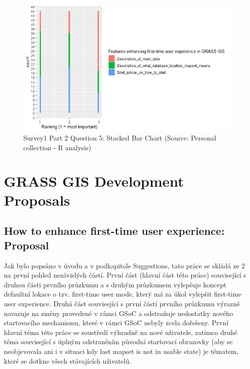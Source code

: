 \documentclass[a4paper,10pt,twoside]{article}
\begin{document}
\vspace{0.3cm}
\begin{figure}[hbt!] 
\begin{center}
\includegraphics[width=15cm]{../surveys/analyzed_data/survey1_part2_question5_histogram_r.png} 
\caption[Survey1 Part 2 Question 5: Stacked Bar Chart]{Survey1 Part 2 Question 5: Stacked Bar Chart (Source: Personal collection - R analysis)}
\label{fig:survey1_part2_question5_histogram_r}
\end{center}
\end{figure}

\newpage
\vspace*{-1cm}
\section{GRASS GIS Development Proposals}
\label{sec:proposal}

\newpage
\vspace*{-1cm}
\subsection{How to enhance first-time user experience: Proposal}
\label{sec:proposal1}


Jak bylo popsáno v úvodu a v podkapitole Suggestions, tato práce se skládá ze 2 na první pohled nezávislých částí. První část (hlavní část této práce) související s druhou části prvního průzkumu a s druhým průzkumem vylepšuje koncept defaultní lokace o tzv. first-time user mode, který má za úkol vylepšit first-time user experience.  Druhá část související s první částí prvního průzkumu výrazně navazuje na změny provedené v rámci GSoC a odstraňuje nedostatky nového startovacího mechanismu, které v rámci GSoC nebyly zcela dořešeny. První hlavní téma této práce se soustředí výhradně na nové uživatele, zatímco druhé téma související s úplným odstraněním původní startovací obrazovky (aby se neobjevovala ani i v situaci kdy last mapset is not in usable state) je tématem, které se dotkne všech stávajících uživatelů.
\end{document}
